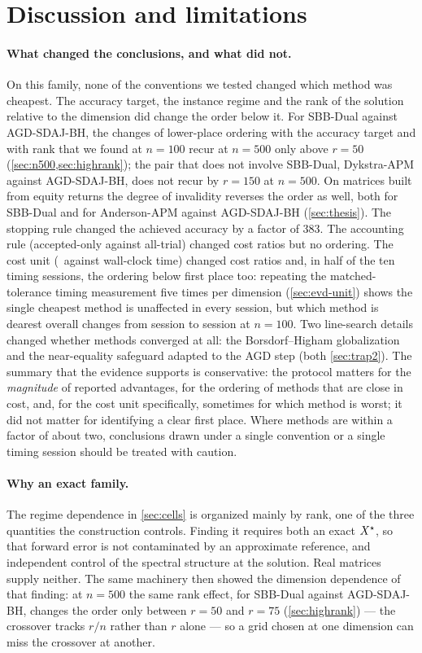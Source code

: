 \section{Discussion and limitations}\label{sec:discussion}

\paragraph{What changed the conclusions, and what did not.}
On this family, none of the conventions we tested changed which method was
cheapest. The accuracy target, the instance regime and the rank of the solution
relative to the dimension did change the order below it. For SBB-Dual against AGD-SDAJ-BH, the changes
of lower-place ordering with the
accuracy target and with rank that we found at $n=100$ recur at $n=500$ only
above $r=50$ (\cref{sec:n500,sec:highrank}); the pair that does not involve
SBB-Dual, Dykstra-APM against AGD-SDAJ-BH, does not recur by $r=150$ at
$n=500$. On matrices built from equity returns the degree of invalidity
reverses the order as well, both for SBB-Dual and for Anderson-APM against
AGD-SDAJ-BH (\cref{sec:thesis}). The stopping rule changed the achieved
accuracy by a factor of 383. The accounting rule (accepted-only against
all-trial) changed cost ratios but no ordering. The cost unit (\EVDs\ against
wall-clock time) changed cost ratios and, in half of the ten timing sessions, the
ordering below first place too: repeating the matched-tolerance timing
measurement five times per dimension
(\cref{sec:evd-unit}) shows the single cheapest method is unaffected in
every session, but which method is dearest overall changes from session to
session at $n=100$. Two line-search details changed whether methods converged
at all: the Borsdorf--Higham globalization and the
near-equality safeguard adapted to the AGD step (both \cref{sec:trap2}). The summary
that the evidence supports is conservative: the protocol matters for the
\emph{magnitude} of reported advantages, for the ordering of methods that
are close in cost, and, for the cost unit specifically, sometimes for which
method is worst; it did not matter for identifying a clear first place.
Where methods are within a factor of about two, conclusions drawn under a
single convention or a single timing session should be treated with
caution.

\paragraph{Why an exact family.}
The regime dependence in \cref{sec:cells} is organized mainly by rank, one of
the three quantities the construction controls. Finding it requires both an
exact $X^\star$, so that forward error is not contaminated by an approximate
reference, and independent control of the spectral structure at the
solution. Real matrices supply neither. The same machinery then showed the
dimension dependence of that finding: at $n=500$ the same rank effect, for
SBB-Dual against AGD-SDAJ-BH, changes the order only between $r=50$ and
$r=75$ (\cref{sec:highrank}) --- the crossover tracks $r/n$ rather than $r$
alone --- so a grid chosen at one dimension can miss the
crossover at another.

